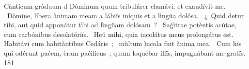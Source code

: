 { Cànticum gràduum}
{%
d Dòminum quum tribulárer clamávi, et exaudívit me. 
~Dòmine, líbera ànimam meam a lábiïs iníquïs et a lìngüa dolósa. 
~¿~Quid detur tìbi, aut quid apponátur tìbi ad lìngüam dolósam~? 
~Saġìttae potèntis acútae, cum carbónibus desolatóriïs. 
~Heŭ mìhi, quia incolátus meus prolongátus est. Habitávi cum habitàntibus Cedáris~; 
~mùltum ìncola fuit ànima mea. 
~Cum hïs qui odérunt paċem, èram paċìficus~; quum loquébar illïs, impugnábant me gratïs. 
}
{18}{1}
